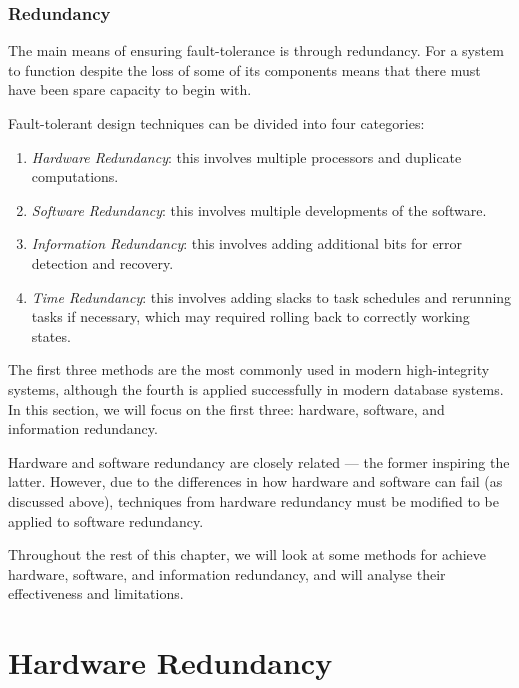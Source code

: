 \subsubsection*{Redundancy}


The main means of ensuring fault-tolerance is through redundancy.  For a system to function despite the loss of some of its components means that there must have been spare capacity to begin with. 

Fault-tolerant design techniques can be divided into four categories:

\begin{enumerate}

\item \emph{Hardware Redundancy}: this involves multiple processors and
duplicate computations.

\item \emph{Software Redundancy}: this involves multiple developments of the
software. 

\item \emph{Information Redundancy}: this involves adding additional bits for error detection and recovery.

\item \emph{Time Redundancy}: this involves adding slacks to task schedules and rerunning tasks if necessary, which may required rolling back to correctly working states.

\end{enumerate}

The first three methods are the most commonly used in modern high-integrity systems, although the fourth is applied successfully in modern database systems. In this section, we will focus on the first three: hardware, software, and information redundancy.

Hardware and software redundancy are closely related --- the former inspiring the latter. However, due to the differences in how hardware and software can fail (as discussed above), techniques from hardware redundancy must be modified to be applied to software redundancy.

Throughout the rest of this chapter, we will look at some methods for achieve hardware, software, and information redundancy, and will analyse their effectiveness and limitations. 

\section{Hardware Redundancy}
\label{sec:fault-tolerance:hardware-redundancy}

